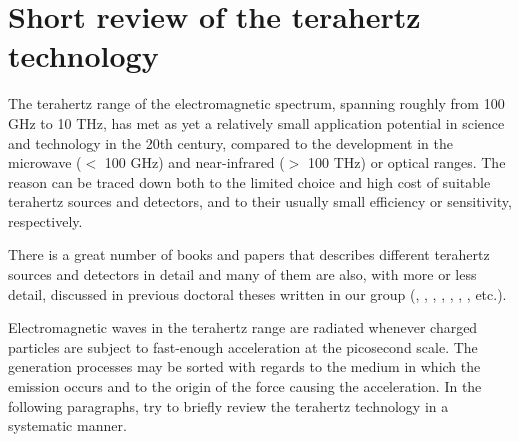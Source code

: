 \section{Short review of the terahertz technology}
The terahertz range of the electromagnetic spectrum, spanning roughly from 100 GHz to 10 THz, has met as yet a relatively small application potential in science and technology in the 20th century, compared to the development in the microwave ($<$ 100 GHz) and near-infrared ($>$ 100 THz) or optical ranges. The reason can be traced down both to the limited choice and high cost of suitable terahertz sources and detectors, and to their usually small efficiency or sensitivity, respectively. %

There is a great number of books and papers that describes different terahertz sources and detectors in detail \cite[pp. 155-158]{lee2008book}\cite{sullivan2012field,lewis2014review}
and many of them are also, with more or less detail, discussed in previous doctoral theses written in our group (\cite[pp. 2-30]{pashkin2004phd}, \cite[pp. 19-25]{nemec2006phd}, \cite[pp. 7-26]{fekete2008phd}, \cite[pp. 11-21]{sibik2010dp}, \cite[pp. 31-45]{yahiaoui2011phd}, \cite[pp. 33-38]{mics2012phd}, \cite[pp. 25-33]{skoromets2013phd}, etc.).

Electromagnetic waves in the terahertz range are radiated whenever charged particles are subject to fast-enough acceleration at the picosecond scale. 
The generation processes may be sorted with regards to the medium in which the emission occurs and to the origin of the force causing the acceleration.  
In the following paragraphs, try to briefly review the terahertz technology in a systematic manner.
